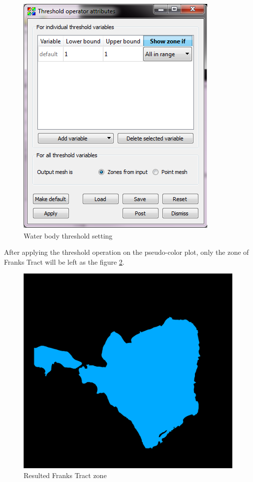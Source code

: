 \documentclass[12pt]{report}
\begin{document}
\begin{figure}
\begin{center}
\includegraphics{franksTractZoneThreshold}
\caption{Water body threshold setting }
\label{figure:franksTractZoneThreshold}
\end{center}
\end{figure} 			

After applying the threshold operation on the pseudo-color plot, only the zone of Franks Tract will be left as the figure
\ref{figure:franksTractZone}.

\begin{figure}
\begin{center}
\includegraphics{franksTractZone600}
\caption{Resulted Franks Tract zone }
\label{figure:franksTractZone}
\end{center}
\end{figure} 	
\end{document}
